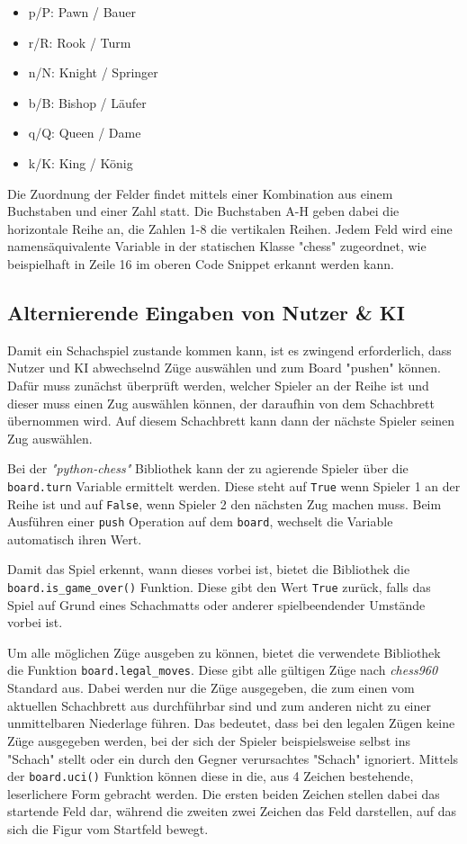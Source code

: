 \begin{itemize}
\tightlist
\item
  p/P: Pawn / Bauer
\item
  r/R: Rook / Turm
\item
  n/N: Knight / Springer
\item
  b/B: Bishop / Läufer
\item
  q/Q: Queen / Dame
\item
  k/K: King / König
\end{itemize}

    Die Zuordnung der Felder findet mittels einer Kombination aus einem
Buchstaben und einer Zahl statt. Die Buchstaben A-H geben dabei die
horizontale Reihe an, die Zahlen 1-8 die vertikalen Reihen. Jedem Feld
wird eine namensäquivalente Variable in der statischen Klasse "chess"
zugeordnet, wie beispielhaft in Zeile 16 im oberen Code Snippet erkannt
werden kann.

    \subsection{Alternierende Eingaben von Nutzer \&
KI}\label{alternierende-eingaben-von-nutzer-ki}

Damit ein Schachspiel zustande kommen kann, ist es zwingend
erforderlich, dass Nutzer und KI abwechselnd Züge auswählen und zum
Board "pushen" können. Dafür muss zunächst überprüft werden, welcher
Spieler an der Reihe ist und dieser muss einen Zug auswählen können, der
daraufhin von dem Schachbrett übernommen wird. Auf diesem Schachbrett
kann dann der nächste Spieler seinen Zug auswählen.

Bei der \emph{"python-chess"} Bibliothek kann der zu agierende Spieler
über die \texttt{board.turn} Variable ermittelt werden. Diese steht auf
\texttt{True} wenn Spieler 1 an der Reihe ist und auf \texttt{False},
wenn Spieler 2 den nächsten Zug machen muss. Beim Ausführen einer
\texttt{push} Operation auf dem \texttt{board}, wechselt die Variable
automatisch ihren Wert.

Damit das Spiel erkennt, wann dieses vorbei ist, bietet die Bibliothek
die \texttt{board.is\_game\_over()} Funktion. Diese gibt den Wert
\texttt{True} zurück, falls das Spiel auf Grund eines Schachmatts oder
anderer spielbeendender Umstände vorbei ist.

Um alle möglichen Züge ausgeben zu können, bietet die verwendete
Bibliothek die Funktion \texttt{board.legal\_moves}. Diese gibt alle
gültigen Züge nach \emph{chess960} Standard aus. Dabei werden nur die
Züge ausgegeben, die zum einen vom aktuellen Schachbrett aus
durchführbar sind und zum anderen nicht zu einer unmittelbaren
Niederlage führen. Das bedeutet, dass bei den legalen Zügen keine Züge
ausgegeben werden, bei der sich der Spieler beispielsweise selbst ins
"Schach" stellt oder ein durch den Gegner verursachtes "Schach"
ignoriert. Mittels der \texttt{board.uci()} Funktion können diese in
die, aus 4 Zeichen bestehende, leserlichere Form gebracht werden. Die
ersten beiden Zeichen stellen dabei das startende Feld dar, während die
zweiten zwei Zeichen das Feld darstellen, auf das sich die Figur vom
Startfeld bewegt.

